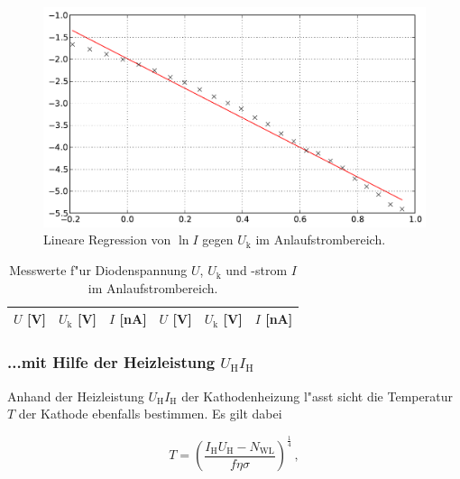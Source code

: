 			\begin{figure}[h!]
				\centering
				\includegraphics[width = 15cm]{img/messung2.pdf}
				\caption{Lineare Regression von $\ln{I}$ gegen $U_\mathrm{k}$ im Anlaufstrombereich.}
				\label{fig:messung2}
			\end{figure}

			\begin{table}[h!]
				\begin{center}
					\label{messung1}
					\caption{Messwerte f"ur Diodenspannung $U$, $U_\mathrm{k}$ und -strom $I$ im Anlaufstrombereich.}
					\begin{tabular}{|l|l|l||l|l|l|}
						\hline
							$U$ [V] & $U_\mathrm{k}$ [V] & $I$ [nA] & $U$ [V] & $U_\mathrm{k}$ [V] & $I$ [nA] \\
						\hline 
						\hline
							
						\hline 
					\end{tabular}
				\end{center}
			\end{table}

			\clearpage

		\subsubsection{...mit Hilfe der Heizleistung $U_\mathrm{H}I_\mathrm{H}$}
			\label{subsubsec:temp2}
			Anhand der Heizleistung $U_\mathrm{H}I_\mathrm{H}$ der Kathodenheizung l"asst sicht die Temperatur $T$ der Kathode ebenfalls bestimmen.
			Es gilt dabei

			\begin{equation*}
				T = \left(\frac{I_\mathrm{H}U_\mathrm{H} - N_\mathrm{WL}}{f \eta \sigma}\right)^{\frac{1}{4}}\,,
			\end{equation*}

